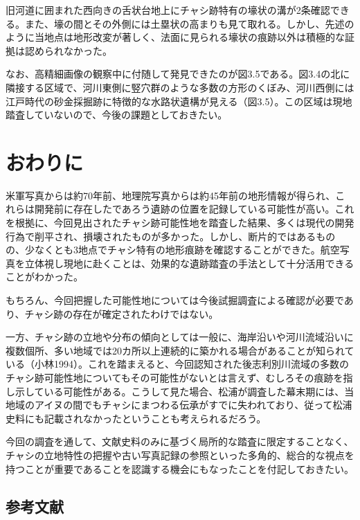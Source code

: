 \documentclass[a4j,11pt,twocolumn,openany]{jsbook}
\begin{document}
旧河道に囲まれた西向きの舌状台地上にチャシ跡特有の壕状の溝が2条確認できる。また、壕の間とその外側には土塁状の高まりも見て取れる。しかし、先述のように当地点は地形改変が著しく、法面に見られる壕状の痕跡以外は積極的な証拠は認められなかった。

なお、高精細画像の観察中に付随して発見できたのが図3.5である。図3.4の北に隣接する区域で、河川東側に竪穴群のような多数の方形のくぼみ、河川西側には江戸時代の砂金採掘跡に特徴的な水路状遺構が見える（図3.5）。この区域は現地踏査していないので、今後の課題としておきたい。

\section{おわりに}

米軍写真からは約70年前、地理院写真からは約45年前の地形情報が得られ、これらは開発前に存在したであろう遺跡の位置を記録している可能性が高い。これを根拠に、今回見出されたチャシ跡可能性地を踏査した結果、多くは現代の開発行為で削平され、損壊されたものが多かった。しかし、断片的ではあるものの、少なくとも3地点でチャシ特有の地形痕跡を確認することができた。航空写真を立体視し現地に赴くことは、効果的な遺跡踏査の手法として十分活用できることがわかった。

もちろん、今回把握した可能性地については今後試掘調査による確認が必要であり、チャシ跡の存在が確定されたわけではない。

一方、チャシ跡の立地や分布の傾向としては一般に、海岸沿いや河川流域沿いに複数個所、多い地域では20カ所以上連続的に築かれる場合があることが知られている（小林1994）。これを踏まえると、今回認知された後志利別川流域の多数のチャシ跡可能性地についてもその可能性がないとは言えず、むしろその痕跡を指し示している可能性がある。こうして見た場合、松浦が調査した幕末期には、当地域のアイヌの間でもチャシにまつわる伝承がすでに失われており、従って松浦史料にも記載されなかったということも考えられるだろう。

今回の調査を通して、文献史料のみに基づく局所的な踏査に限定することなく、チャシの立地特性の把握や古い写真記録の参照といった多角的、総合的な視点を持つことが重要であることを認識する機会にもなったことを付記しておきたい。
\vspace{1\baselineskip}

\subsection*{参考文献}
\end{document}
